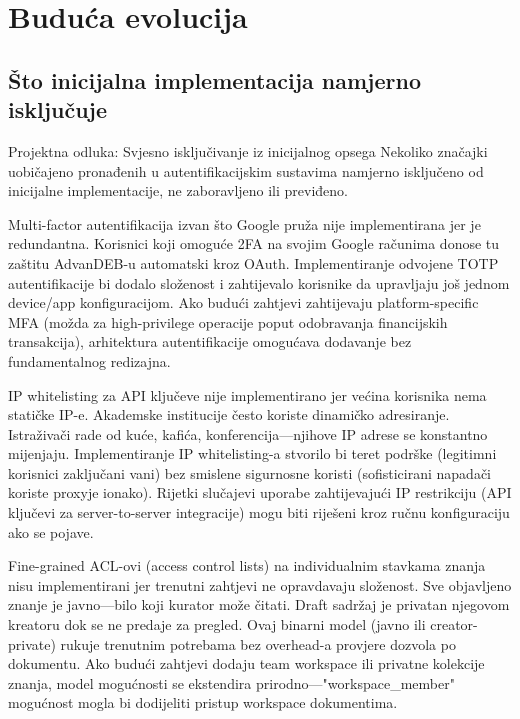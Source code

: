 \documentclass[12pt,a4paper]{article}
\begin{document}
\section{Buduća evolucija}

\subsection{Što inicijalna implementacija namjerno isključuje}

\begin{rationale}{Projektna odluka: Svjesno isključivanje iz inicijalnog opsega}
Nekoliko značajki uobičajeno pronađenih u autentifikacijskim sustavima namjerno isključeno od inicijalne implementacije, ne zaboravljeno ili previđeno.
\end{rationale}

Multi-factor autentifikacija izvan što Google pruža nije implementirana jer je redundantna. Korisnici koji omoguće 2FA na svojim Google računima donose tu zaštitu AdvanDEB-u automatski kroz OAuth. Implementiranje odvojene TOTP autentifikacije bi dodalo složenost i zahtijevalo korisnike da upravljaju još jednom device/app konfiguracijom. Ako budući zahtjevi zahtijevaju platform-specific MFA (možda za high-privilege operacije poput odobravanja financijskih transakcija), arhitektura autentifikacije omogućava dodavanje bez fundamentalnog redizajna.

IP whitelisting za API ključeve nije implementirano jer većina korisnika nema statičke IP-e. Akademske institucije često koriste dinamičko adresiranje. Istraživači rade od kuće, kafića, konferencija—njihove IP adrese se konstantno mijenjaju. Implementiranje IP whitelisting-a stvorilo bi teret podrške (legitimni korisnici zaključani vani) bez smislene sigurnosne koristi (sofisticirani napadači koriste proxyje ionako). Rijetki slučajevi uporabe zahtijevajući IP restrikciju (API ključevi za server-to-server integracije) mogu biti riješeni kroz ručnu konfiguraciju ako se pojave.

Fine-grained ACL-ovi (access control lists) na individualnim stavkama znanja nisu implementirani jer trenutni zahtjevi ne opravdavaju složenost. Sve objavljeno znanje je javno—bilo koji kurator može čitati. Draft sadržaj je privatan njegovom kreatoru dok se ne predaje za pregled. Ovaj binarni model (javno ili creator-private) rukuje trenutnim potrebama bez overhead-a provjere dozvola po dokumentu. Ako budući zahtjevi dodaju team workspace ili privatne kolekcije znanja, model mogućnosti se ekstendira prirodno—"workspace\_member" mogućnost mogla bi dodijeliti pristup workspace dokumentima.
\end{document}
